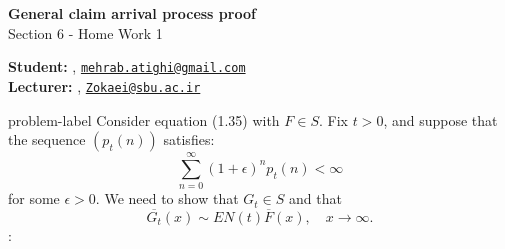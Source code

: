 	






		\begin{Large}
		\textsf{\textbf{General claim arrival process proof}}\\
		Section 6 - Home Work 1
	\end{Large}
	
	\vspace{1ex}
	
	\textsf{\textbf{Student:}} , \href{mailto:mehrab.atighi@gmail.com}{\texttt{mehrab.atighi@gmail.com}}\\
	\textsf{\textbf{Lecturer:}} , \href{mailto:Zokaei@sbu.ac.ir}{\texttt{Zokaei@sbu.ac.ir}}
	
	
	\vspace{2ex}
	
	\begin{problem}{}{problem-label}
		Consider equation (1.35) with $F \in S$. Fix $t > 0$, and suppose that the sequence $(p_t(n))$ satisfies:
		\[
		\sum_{n=0}^{\infty} (1 + \epsilon)^n p_t(n) < \infty
		\]
		for some $\epsilon > 0$. We need to show that $G_t \in S$ and that
		\[
		\overline{G_t}(x) \sim EN(t) \overline{F}(x), \quad x \to \infty.
		\]\cite{Embrechts.etal1997}:
	\end{problem}
	
